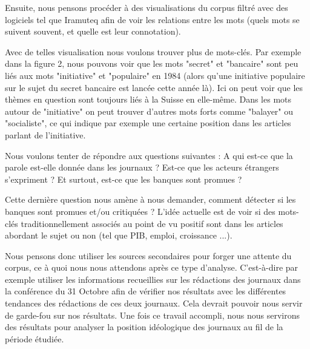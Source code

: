 \documentclass[11pt]{article}
\begin{document}
Ensuite, nous pensons procéder à des visualisations du corpus filtré avec des
logiciels tel que Iramuteq afin de voir les relations entre les mots (quels mots
se suivent souvent, et quelle est leur connotation).

Avec de telles visualisation nous voulons trouver plus de mots-clés. Par exemple
dans la figure 2, nous pouvons voir que les mots "secret" et "bancaire" sont peu
liés aux mots "initiative" et "populaire" en 1984 (alors qu'une initiative
populaire sur le sujet du secret bancaire est lancée cette année là). Ici on
peut voir que les thèmes en question sont toujours liés à la Suisse en
elle-même. Dans les mots autour de "initiative" on peut trouver d'autres mots
forts comme "balayer" ou "socialiste", ce qui indique par exemple une certaine
position dans les articles parlant de l'initiative.

Nous voulons tenter de répondre aux questions suivantes : A qui est-ce que la
parole est-elle donnée dans les journaux ? Est-ce que les acteurs étrangers
s'expriment ? Et surtout, est-ce que les banques sont promues ?

Cette dernière question nous amène à nous demander, comment détecter si les
banques sont promues et/ou critiquées ? L'idée actuelle est de voir si des
mots-clés traditionnellement associés au point de vu positif sont dans les
articles abordant le sujet ou non (tel que PIB, emploi, croissance ...).
    
Nous pensons donc utiliser les sources secondaires pour forger une attente du
corpus, ce à quoi nous nous attendons après ce type d’analyse. C’est-à-dire par
exemple utiliser les informations recueillies sur les rédactions des journaux
dans la conférence du 31 Octobre \citep{ConfClass1} afin de vérifier nos
résultats avec les différentes tendances des rédactions de ces deux journaux.
Cela devrait pouvoir nous servir de garde-fou sur nos résultats. Une fois ce
travail accompli, nous nous servirons des résultats pour analyser la position
idéologique des journaux au fil de la période étudiée. 

\newpage



\end{document}
